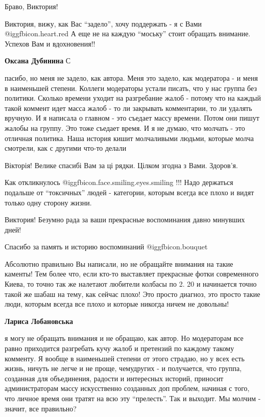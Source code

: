 \begin{itemize}
Браво, Виктория!


Виктория, вижу, как Вас \enquote{задело}, хочу поддержать - я с Вами @igg{fbicon.heart.red}  А еще не на
каждую \enquote{моську} стоит обращать внимание. Успехов Вам и вдохновения!!

\begin{itemize} %
\textbf{Оксана Дубинина} С

пасибо, но меня не задело, как автора. Меня это задело, как модератора - и меня
в наименьшей степени. Коллеги модераторы устали писать, что у нас группа без
политики. Сколько времени уходит на разгребание жалоб - потому что на каждый
такой коммент идет масса жалоб - то ли закрывать комментарии, то ли удалять
вручную. И я написала о главном - это съедает массу времени. Потом они пишут
жалобы на группу. Это тоже съедает время. И я не думаю, что молчать - это
отличная политика. Наша история кишит молчаливыми людьми, которые молча
смотрели, как с другими что-то делали

\end{itemize} %

Вікторія! Велике спасибі Вам за ці рядки. Цілком згодна з Вами. Здоров'я.


Как откликнулось @igg{fbicon.face.smiling.eyes.smiling} !!! Надо держаться подальше от \enquote{токсичных} людей - категории,
которым всегда все плохо и видят только одну сторону жизни.


Виктория! Безумно рада за ваши прекрасные воспоминания давно минувших дней!

Спасибо за память и историю воспоминаний  @igg{fbicon.bouquet} 


Абсолютно правильно Вы написали, но не обращайте внимания на такие каменты! Тем
более что, если кто-то выставляет прекрасные фотки современного Киева, то точно
так же налетают любители колбасы по 2. 20 и начинается точно такой же шабаш на
тему, как сейчас плохо! Это просто диагноз, это просто такие люди, которым
всегда все плохо и которые никогда ничем не довольны!

\begin{itemize} %
\textbf{Лариса Лобановська} 

я могу не обращать внимания и не обращаю, как автор. Но модераторам все равно
приходится разгребать кучу жалоб и претензий по каждому такому комменту. Я
вообще в наименьшей степени от этого страдаю, но у всех есть жизнь, ничуть не
легче и не проще, чемудругих - и получается, что группа, созданная для
объединения, радости и интересных историй, приносит администраторам массу
искусственно созданных доп проблем, начиная с того, что личное время они тратят
на всю эту \enquote{прелесть}. Так и выходит. Мы молчим - значит, все правильно?


\end{itemize}
\end{itemize}
